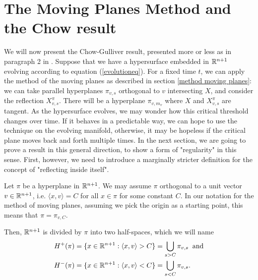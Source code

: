 \section{The Moving Planes Method and the Chow result}

We will now present the Chow-Gulliver result, presented more or less as in paragraph 2 in \cite{Chow}.
Suppose that we have a hypersurface embedded in $\mathbb{R}^{n+1}$ evolving according to equation (\ref{evolutioneq}). For a fixed time $t$, we can apply the method of the moving planes as described in section \ref{method moving planes}: we can take parallel hyperplanes $\pi_{v,s}$ orthogonal to $v$ intersecting $X$, and consider the reflection  $X_{v,s}^\pi$. There will be a hyperplane $\pi_{v,m_v}$ where $X$ and $X_{v,s}^\pi$ are tangent. As the hypersurface evolves, we may wonder how this critical threshold changes over time. If it behaves in a predictable way, we can hope to use the technique on the evolving manifold, otherwise, it may be hopeless if the critical plane moves back and forth multiple times. In the next section, we are going to prove a result in this general direction, to show a form of "regularity" in this sense. First, however, we need to introduce a marginally stricter definition for the concept of "reflecting inside itself". 



Let $\pi$ be a hyperplane in $\mathbb{R}^{n+1}$. We may assume $\pi$ orthogonal to a unit vector $v\in\mathbb{R}^{n+1}$, i.e. $\langle x, v\rangle= C$ for all $x\in \pi$ for some constant $C$. In our notation for the method of moving planes, assuming we pick the origin as a starting point, this means that $\pi = \pi_{v, C}$. 

Then, $\mathbb{R}^{n+1}$ is divided by $\pi$ into two half-spaces, which we will name 
\begin{align*}
H^+(\pi)&=\{x \in \mathbb{R}^{n+1} : \langle x, v\rangle > C\}= \bigcup_{s>C} \pi_{v, s} \;\;\mathrm{and}\\
H^-(\pi)&=\{x \in \mathbb{R}^{n+1} : \langle x, v\rangle < C\}= \bigcup_{s<C} \pi_{v, s}.
\end{align*} 

